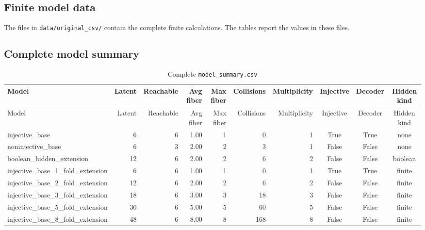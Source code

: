 \begin{landscape}
\section{Finite model data}
\label{app:fulldata}

The files in \nolinkurl{data/original_csv/} contain the complete finite calculations. The tables report the values in these files.

\subsection{Complete model summary}

\scriptsize
\begin{longtable}{@{}lrrrrrrccc@{}}
\caption{Complete \texttt{model\_summary.csv}}\label{tab:fullmodelsummary}\\
\toprule
Model & Latent & Reachable & Avg fiber & Max fiber & Collisions & Multiplicity & Injective & Decoder & Hidden kind \\
\midrule
\endfirsthead
\toprule
Model & Latent & Reachable & Avg fiber & Max fiber & Collisions & Multiplicity & Injective & Decoder & Hidden kind \\
\midrule
\endhead
injective\_base & 6 & 6 & 1.00 & 1 & 0 & 1 & True & True & none \\
noninjective\_base & 6 & 3 & 2.00 & 2 & 3 & 1 & False & False & none \\
boolean\_hidden\_extension & 12 & 6 & 2.00 & 2 & 6 & 2 & False & False & boolean \\
injective\_base\_1\_fold\_extension & 6 & 6 & 1.00 & 1 & 0 & 1 & True & True & finite \\
injective\_base\_2\_fold\_extension & 12 & 6 & 2.00 & 2 & 6 & 2 & False & False & finite \\
injective\_base\_3\_fold\_extension & 18 & 6 & 3.00 & 3 & 18 & 3 & False & False & finite \\
injective\_base\_5\_fold\_extension & 30 & 6 & 5.00 & 5 & 60 & 5 & False & False & finite \\
injective\_base\_8\_fold\_extension & 48 & 6 & 8.00 & 8 & 168 & 8 & False & False & finite \\
\bottomrule
\end{longtable}
\end{landscape}

